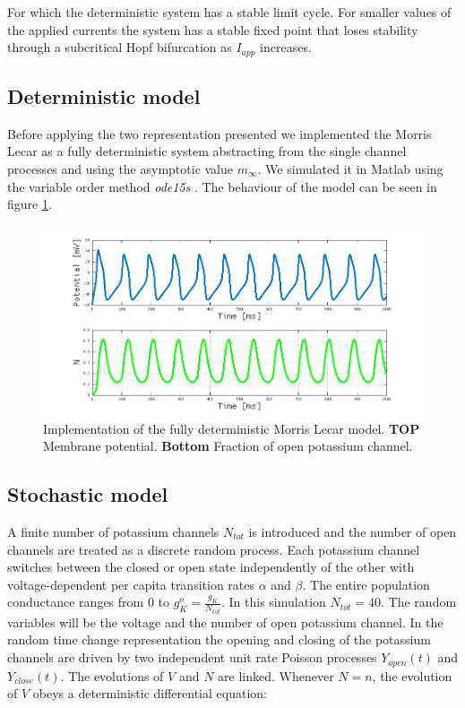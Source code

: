 For which the deterministic system has a stable limit cycle.
For smaller values of the applied currents the system has a stable fixed point that loses stability through a subcritical Hopf bifurcation as $I_{app}$ increases.

	\subsection{Deterministic model}
	Before applying the two representation presented we implemented the Morris Lecar as a fully deterministic system abstracting from the single channel processes and using the asymptotic value $m_\infty$.
	We simulated it in Matlab using the variable order method \emph{ode15s} \cite{ode15s}.
	The behaviour of the model can be seen in figure \ref{fig:morris-lecar}.

	\begin{figure}
		\includegraphics[width=\textwidth]{Figures/morris-lecar}
		\caption{Implementation of the fully deterministic Morris Lecar model. \textbf{TOP} Membrane potential. \textbf{Bottom} Fraction of open potassium channel.}
		\label{fig:morris-lecar}
	\end{figure}

	\subsection{Stochastic model}
	A finite number of potassium channels $N_{tot}$ is introduced and the number of open channels are treated as a discrete random process.
	Each potassium channel switches between the closed or open state independently of the other with voltage-dependent per capita transition rates $\alpha$ and $\beta$.
	The entire population conductance ranges from $0$ to $g_K^o = \frac{g_K}{N_{tot}}$.
	In this simulation $N_{tot} = 40$.
	The random variables will be the voltage and the number of open potassium channel.
	In the random time change representation the opening and closing of the potassium channels are driven by two independent unit rate Poisson processes $Y_{open}(t)$ and $Y_{close}(t)$.
	The evolutions  of $V$ and $N$ are linked.
	Whenever $N=n$, the evolution of $V$ obeys a deterministic differential equation:

